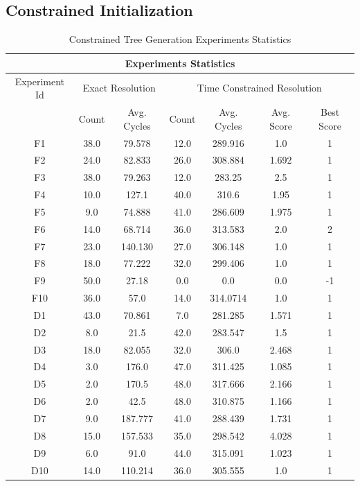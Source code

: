 \documentclass[a4paper,10pt,titlepage]{article}
\begin{document}
\subsection{Constrained Initialization}
\begin{table}[H]
\caption{Constrained Tree Generation Experiments Statistics} %
\centering 
\begin{tabular}{c @{\extracolsep{12pt}} c c @{\extracolsep{12pt}} c c c c }
			
\multicolumn{7}{c}{\textbf{Experiments Statistics}} \\
\hline
Experiment Id & \multicolumn{2}{c}{Exact Resolution} & \multicolumn{4}{c}{Time Constrained Resolution}\\
\cline{2-3}\cline{4-7}
 & Count & Avg. Cycles & Count & Avg. Cycles & Avg. Score & Best Score\\
\cline{2-3}\cline{4-7}
F1 & 38.0 & 79.578 & 12.0 & 289.916 & 1.0 & 1 \\
F2 & 24.0 & 82.833 & 26.0 & 308.884 & 1.692 & 1 \\
F3 & 38.0 & 79.263 & 12.0 & 283.25 & 2.5 & 1 \\
F4 & 10.0 & 127.1 & 40.0 & 310.6 & 1.95 & 1 \\
F5 & 9.0 & 74.888 & 41.0 & 286.609 & 1.975 & 1 \\
F6 & 14.0 & 68.714 & 36.0 & 313.583 & 2.0 & 2 \\
F7 & 23.0 & 140.130 & 27.0 & 306.148 & 1.0 & 1 \\
F8 & 18.0 & 77.222 & 32.0 & 299.406 & 1.0 & 1 \\
F9 & 50.0 & 27.18 & 0.0 & 0.0 & 0.0 & -1 \\
F10 & 36.0 & 57.0 & 14.0 & 314.0714 & 1.0 & 1 \\
D1 & 43.0 & 70.861 & 7.0 & 281.285 & 1.571 & 1 \\
D2 & 8.0 & 21.5 & 42.0 & 283.547 & 1.5 & 1 \\
D3 & 18.0 & 82.055 & 32.0 & 306.0 & 2.468 & 1 \\
D4 & 3.0 & 176.0 & 47.0 & 311.425 & 1.085 & 1 \\
D5 & 2.0 & 170.5 & 48.0 & 317.666 & 2.166 & 1 \\
D6 & 2.0 & 42.5 & 48.0 & 310.875 & 1.166 & 1 \\
D7 & 9.0 & 187.777 & 41.0 & 288.439 & 1.731 & 1 \\
D8 & 15.0 & 157.533 & 35.0 & 298.542 & 4.028 & 1 \\
D9 & 6.0 & 91.0 & 44.0 & 315.091 & 1.023 & 1 \\
D10 & 14.0 & 110.214 & 36.0 & 305.555 & 1.0 & 1 \\
\end{tabular} 
\label{tab:con_result} 
\end{table}
\end{document}

